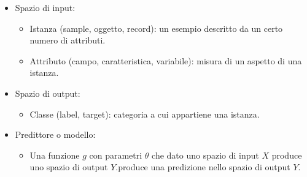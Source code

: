 \documentclass{../main.tex}[subfiles]
\begin{document}
\begin{itemize}
	\item Spazio di input:
	\begin{itemize}
		\item Istanza (sample, oggetto, record): un esempio descritto da un certo numero di attributi.
		\item Attributo (campo, caratteristica, variabile): misura di un aspetto di una istanza.
	
	\end{itemize}
	\item Spazio di output:
	\begin{itemize}
		\item Classe (label, target): categoria a cui appartiene una istanza.
	\end{itemize}
	\item Predittore o modello:
	\begin{itemize}
		\item Una funzione $g$ con parametri $\theta$ che dato uno spazio di input $X$ produce uno spazio di output $Y$.produce una predizione nello spazio di output $Y$.
	\end{itemize}
\end{itemize}
\end{document}
